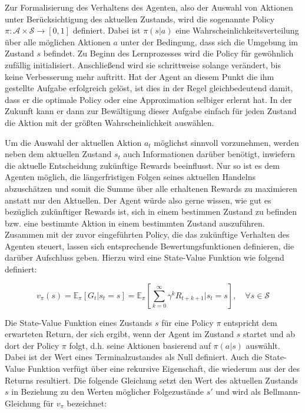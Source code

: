 Zur Formalisierung des Verhaltens des Agenten, also der Auswahl von Aktionen unter Berücksichtigung des aktuellen Zustands, wird die sogenannte Policy $\pi: \mathcal{A} \times \mathcal{S} \to [0, 1]$ definiert. Dabei ist $\pi(s|a)$ eine Wahrscheinlichkeitsverteilung über alle möglichen Aktionen $a$ unter der Bedingung, dass sich die Umgebung im Zustand $s$ befindet. Zu Beginn des Lernprozesses wird die Policy für gewöhnlich zufällig initialisiert. Anschließend wird sie schrittweise solange verändert, bis keine Verbesserung mehr auftritt. Hat der Agent an diesem Punkt die ihm gestellte Aufgabe erfolgreich gelöst, ist dies in der Regel gleichbedeutend damit, dass er die optimale Policy oder eine Approximation selbiger erlernt hat. In der Zukunft kann er dann zur Bewältigung dieser Aufgabe einfach für jeden Zustand die Aktion mit der größten Wahrscheinlichkeit auswählen.

Um die Auswahl der aktuellen Aktion $a_t$ möglichst sinnvoll vorzunehmen, werden neben dem aktuellen Zustand $s_t$ auch Informationen darüber benötigt, inwiefern die aktuelle Entscheidung zukünftige Rewards beeinflusst. Nur so ist es dem Agenten möglich, die längerfristigen Folgen seines aktuellen Handelns abzuschätzen und somit die Summe über alle erhaltenen Rewards zu maximieren anstatt nur den Aktuellen. Der Agent würde also gerne wissen, \glqq wie gut\grqq{} es bezüglich zukünftiger Rewards ist, sich in einem bestimmen Zustand zu befinden bzw. eine bestimmte Aktion in einem bestimmten Zustand auszuführen. Zusammen mit der zuvor eingeführten Policy, die das zukünftige Verhalten des Agenten steuert, lassen sich entsprechende Bewertungsfunktionen definieren, die darüber Aufschluss geben. Hierzu wird eine State-Value Funktion wie folgend definiert:

\begin{equation*}
  v_\pi(s) = \mathbb{E}_\pi[G_t|s_t=s] = \mathbb{E}_\pi[\sum_{k=0}^{\infty} \gamma^k R_{t+k+1} | s_t=s], \quad \forall s \in \mathcal{S}
  \label{v_pi_eq}
\end{equation*}

Die State-Value Funktion eines Zustands $s$ für eine Policy $\pi$ entspricht dem erwarteten Return, der sich ergibt, wenn der Agent im Zustand $s$ startet und ab dort der Policy $\pi$ folgt, d.h. seine Aktionen basierend auf $\pi(a|s)$ auswählt. Dabei ist der Wert eines Terminalzustandes als Null definiert. Auch die State-Value Funktion verfügt über eine rekursive Eigenschaft, die wiederum aus der des Returns resultiert. Die folgende Gleichung setzt den Wert des aktuellen Zustands $s$ in Beziehung zu den Werten möglicher Folgezustände $s'$ und wird als Bellmann-Gleichung für $v_\pi$ bezeichnet:

